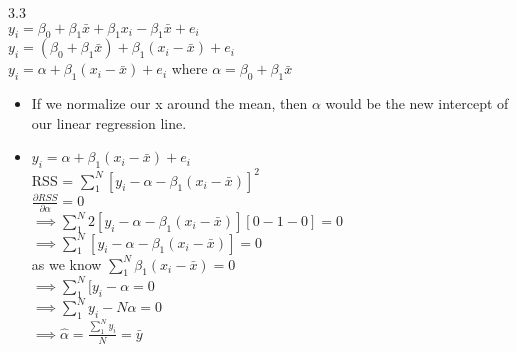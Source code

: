 \documentclass{article}
\begin{document}
	3.3\\
	$y_{i} = \beta_{0} + \beta_{1}\bar{x} + \beta_{1}x_{i} - \beta_{1}\bar{x} + e_{i}$\\
	$y_{i} = (\beta_{0} + \beta_{1}\bar{x}) + \beta_{1}(x_{i}-\bar{x}) + e_{i}$	\\
	$y_{i} = \alpha + \beta_{1}(x_{i}-\bar{x}) + e_{i}$	where $\alpha = \beta_{0} + \beta_{1}\bar{x}$\\
	\begin{itemize}
		\item If we normalize our x around the mean, then $\alpha$ would be the new intercept of our linear regression line. 
		\item $y_{i} = \alpha + \beta_{1}(x_{i}-\bar{x}) + e_{i}$\\
		RSS = $\sum_{1}^{N}[y_{i}-\alpha-\beta_{1}(x_{i}-\bar{x})]^2$\\
		$\frac{\partial RSS}{\partial \alpha} = 0$\\
		$\implies \sum_{1}^{N} 2[y_{i}-\alpha-\beta_{1}(x_{i}-\bar{x})][0-1-0] =0$\\
		$\implies \sum_{1}^{N} [y_{i}-\alpha-\beta_{1}(x_{i}-\bar{x})] = 0$\\ 
		as we know $\sum_{1}^{N} \beta_{1}(x_{i}-\bar{x}) = 0$\\
		$\implies \sum_{1}^{N} [y_{i}-\alpha = 0$ \\
		$\implies \sum_{1}^{N} y_{i} - N\alpha = 0$\\
		$\implies \hat{\alpha} = \frac{\sum_{1}^{N} y_{i}}{N} = \bar{y}$\\
		

\end{itemize}
\end{document}
